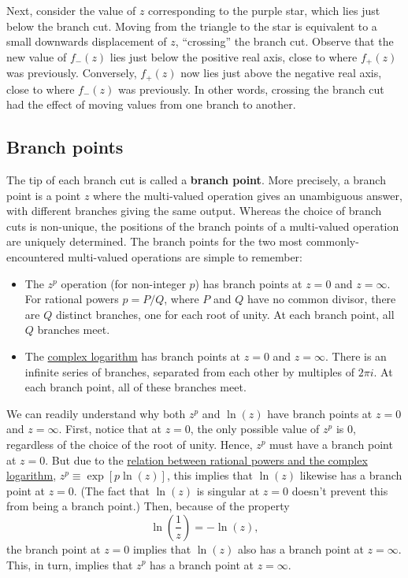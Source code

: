\documentclass[10pt,a4paper]{article}
\begin{document}
Next, consider the value of $z$ corresponding to the purple star,
which lies just below the branch cut.  Moving from the triangle to the
star is equivalent to a small downwards displacement of $z$,
``crossing'' the branch cut.  Observe that the new value of $f_-(z)$
lies just below the positive real axis, close to where $f_+(z)$ was
previously. Conversely, $f_+(z)$ now lies just above the negative real
axis, close to where $f_-(z)$ was previously.  In other words,
crossing the branch cut had the effect of moving values from one
branch to another.

\subsection{Branch points}
\label{branch-points}

The tip of each branch cut is called a \textbf{branch point}. More
precisely, a branch point is a point $z$ where the multi-valued
operation gives an unambiguous answer, with different branches giving
the same output. Whereas the choice of branch cuts is non-unique, the
positions of the branch points of a multi-valued operation are
uniquely determined. The branch points for the two most
commonly-encountered multi-valued operations are simple to remember:
\begin{itemize}
\item
  The $z^p$ operation (for non-integer $p$) has branch points at
  $z = 0$ and $z = \infty$. For rational powers $p = P/Q$, where
  $P$ and $Q$ have no common divisor, there are $Q$ distinct
  branches, one for each root of unity. At each branch point, all $Q$
  branches meet.
\item
  The \hyperref[complex-logarithms]{complex logarithm} has branch
  points at $z = 0$ and $z = \infty$. There is an infinite series of
  branches, separated from each other by multiples of $2 \pi i$. At
  each branch point, all of these branches meet.
\end{itemize}

We can readily understand why both $z^p$ and $\ln(z)$ have branch
points at $z = 0$ and $z = \infty$. First, notice that at $z = 0$, the
only possible value of $z^p$ is $0$, regardless of the choice of the
root of unity. Hence, $z^p$ must have a branch point at $z = 0$.  But
due to the \hyperref[complex-logarithms]{relation between rational
  powers and the complex logarithm}, $z^p \equiv \exp[p\ln(z)]$, this
implies that $\ln(z)$ likewise has a branch point at $z = 0$. (The
fact that $\ln(z)$ is singular at $z = 0$ doesn't prevent this from
being a branch point.) Then, because of the property
\begin{equation}
\ln\left(\frac{1}{z}\right) = -\ln(z),
\end{equation}
the branch point at $z = 0$ implies that $\ln(z)$ also has a branch
point at $z = \infty$. This, in turn, implies that $z^p$ has a
branch point at $z = \infty$.
\end{document}
